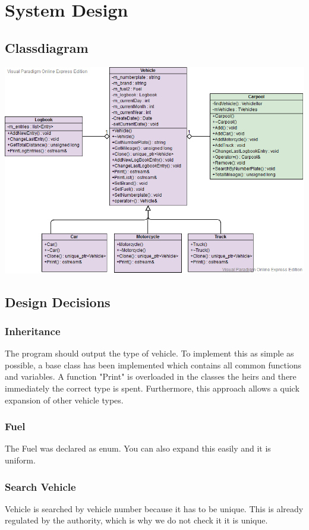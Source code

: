 \section{System Design}
\subsection{Classdiagram}
\includegraphics[scale=0.65]{ClassDiagram}

\subsection{Design Decisions}
\subsubsection{Inheritance}
The program should output the type of vehicle. To implement this as simple as possible, a base class has been implemented which contains all common functions and variables. A function "Print" is overloaded in the classes the heirs and there immediately the correct type is spent.
Furthermore, this approach allows a quick expansion of other vehicle types.

\subsubsection{Fuel}
The Fuel was declared as enum. You can also expand this easily and it is uniform.

\subsubsection{Search Vehicle}
Vehicle is searched by vehicle number because it has to be unique. This is already regulated by the authority, which is why we do not check it it is unique.

